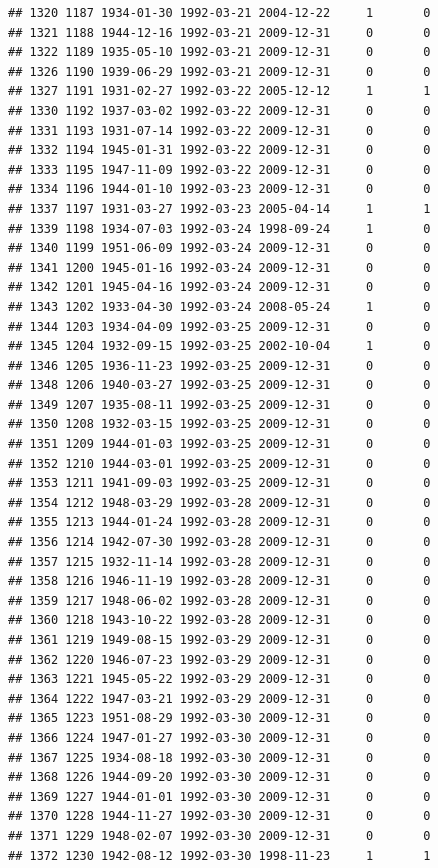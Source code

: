 \documentclass[
]{book}
\theoremstyle{definition}
\theoremstyle{definition}
\theoremstyle{definition}
\theoremstyle{definition}
\theoremstyle{remark}
\begin{document}
\begin{verbatim}
## 1320 1187 1934-01-30 1992-03-21 2004-12-22     1       0
## 1321 1188 1944-12-16 1992-03-21 2009-12-31     0       0
## 1322 1189 1935-05-10 1992-03-21 2009-12-31     0       0
## 1326 1190 1939-06-29 1992-03-21 2009-12-31     0       0
## 1327 1191 1931-02-27 1992-03-22 2005-12-12     1       1
## 1330 1192 1937-03-02 1992-03-22 2009-12-31     0       0
## 1331 1193 1931-07-14 1992-03-22 2009-12-31     0       0
## 1332 1194 1945-01-31 1992-03-22 2009-12-31     0       0
## 1333 1195 1947-11-09 1992-03-22 2009-12-31     0       0
## 1334 1196 1944-01-10 1992-03-23 2009-12-31     0       0
## 1337 1197 1931-03-27 1992-03-23 2005-04-14     1       1
## 1339 1198 1934-07-03 1992-03-24 1998-09-24     1       0
## 1340 1199 1951-06-09 1992-03-24 2009-12-31     0       0
## 1341 1200 1945-01-16 1992-03-24 2009-12-31     0       0
## 1342 1201 1945-04-16 1992-03-24 2009-12-31     0       0
## 1343 1202 1933-04-30 1992-03-24 2008-05-24     1       0
## 1344 1203 1934-04-09 1992-03-25 2009-12-31     0       0
## 1345 1204 1932-09-15 1992-03-25 2002-10-04     1       0
## 1346 1205 1936-11-23 1992-03-25 2009-12-31     0       0
## 1348 1206 1940-03-27 1992-03-25 2009-12-31     0       0
## 1349 1207 1935-08-11 1992-03-25 2009-12-31     0       0
## 1350 1208 1932-03-15 1992-03-25 2009-12-31     0       0
## 1351 1209 1944-01-03 1992-03-25 2009-12-31     0       0
## 1352 1210 1944-03-01 1992-03-25 2009-12-31     0       0
## 1353 1211 1941-09-03 1992-03-25 2009-12-31     0       0
## 1354 1212 1948-03-29 1992-03-28 2009-12-31     0       0
## 1355 1213 1944-01-24 1992-03-28 2009-12-31     0       0
## 1356 1214 1942-07-30 1992-03-28 2009-12-31     0       0
## 1357 1215 1932-11-14 1992-03-28 2009-12-31     0       0
## 1358 1216 1946-11-19 1992-03-28 2009-12-31     0       0
## 1359 1217 1948-06-02 1992-03-28 2009-12-31     0       0
## 1360 1218 1943-10-22 1992-03-28 2009-12-31     0       0
## 1361 1219 1949-08-15 1992-03-29 2009-12-31     0       0
## 1362 1220 1946-07-23 1992-03-29 2009-12-31     0       0
## 1363 1221 1945-05-22 1992-03-29 2009-12-31     0       0
## 1364 1222 1947-03-21 1992-03-29 2009-12-31     0       0
## 1365 1223 1951-08-29 1992-03-30 2009-12-31     0       0
## 1366 1224 1947-01-27 1992-03-30 2009-12-31     0       0
## 1367 1225 1934-08-18 1992-03-30 2009-12-31     0       0
## 1368 1226 1944-09-20 1992-03-30 2009-12-31     0       0
## 1369 1227 1944-01-01 1992-03-30 2009-12-31     0       0
## 1370 1228 1944-11-27 1992-03-30 2009-12-31     0       0
## 1371 1229 1948-02-07 1992-03-30 2009-12-31     0       0
## 1372 1230 1942-08-12 1992-03-30 1998-11-23     1       1

\end{verbatim}
\end{document}
